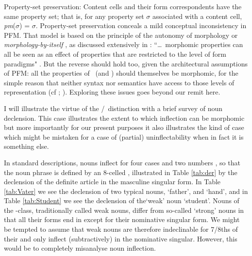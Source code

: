 \documentclass[output=paper,colorlinks,citecolor=brown]{langscibook}
\begin{document}
\ea\label{psp}
Property-set preservation: Content cells and their form correspondents have the same property set; that is, for any property set $\sigma$ associated with a content cell, \textit{pm}($\sigma$) = $\sigma$.
\z
Property-set preservation conceals a mild conceptual inconsistency in PFM. That model is based on the principle of the autonomy of morphology or \textit{morphology-by-itself} \citep{aronoff1994}, as discussed extensively in \citet[Chapter 8]{stump2016}: ``\ldots~morphomic properties can all be seen as an effect of properties that are restricted to the level of form paradigms" \citep[120]{stump2016}. But the reverse should hold too, given the architectural assumptions of PFM: all the properties of \PF\ (and \PR) should themselves be morphomic, for the simple reason that neither syntax nor semantics have access to those levels of representation (cf \citealp{boyeschalchli2019}; \citealp{spencer2021}). Exploring these issues goes beyond our remit here.

I will illustrate the virtue of the \PC/\PF\ distinction with a brief survey of  noun declension. This case  illustrates the extent to which inflection can be morphomic but more importantly for our present purposes it also illustrates the kind of case which might be mistaken for a case of (partial) uninflectability when in fact it is something else.  

In standard descriptions,  nouns inflect for four cases and two numbers \citep{durrell2002}, so that the   noun phrase is defined by an 8-celled , illustrated in Table \ref{tab:der} by the declension of the definite article in the masculine singular form. %
In Table \ref{tab:Vater} we see the declension of two typical nouns,  `father',  and  `hand',  and in  Table \ref{tab:Student} we see the declension of the`weak' noun  `student'. %
Nouns of the -class, traditionally called weak nouns, differ from so-called `strong' nouns in that all their forms end in  except for their nominative singular form.  We might be tempted to assume that weak nouns are therefore  indeclinable for 7/8ths of their  and only inflect (subtractively) in the nominative singular. However, this would be to completely misanalyse  noun inflection.
\end{document}
